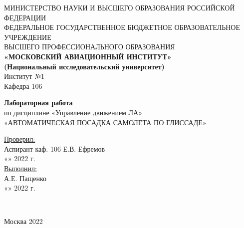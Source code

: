 \begin{center}
    \hfill \break
    \large{МИНИСТЕРСТВО НАУКИ И ВЫСШЕГО ОБРАЗОВАНИЯ РОССИЙСКОЙ ФЕДЕРАЦИИ }\\
    \footnotesize{ФЕДЕРАЛЬНОЕ ГОСУДАРСТВЕННОЕ БЮДЖЕТНОЕ ОБРАЗОВАТЕЛЬНОЕ УЧРЕЖДЕНИЕ}\\ 
    \footnotesize{ВЫСШЕГО ПРОФЕССИОНАЛЬНОГО ОБРАЗОВАНИЯ}\\
    \small{\textbf{«МОСКОВСКИЙ АВИАЦИОННЫЙ ИНСТИТУТ»\\(Национальный исследовательский университет)}}\\ \hline
    \hfill \break
    \normalsize{Институт №1}\\
    \normalsize{Кафедра 106}\\
    \hfill\break

    \large{\textbf{Лабораторная работа} \\ по дисциплине «Управление движением ЛА» }\\

    \normalsize{«АВТОМАТИЧЕСКАЯ ПОСАДКА САМОЛЕТА ПО ГЛИССАДЕ»}\\
\end{center}
\hfill \break

\normalsize{ 
\begin{flushleft}
    \underline{Проверил:} \\
    \hfill \break  
    Аспирант каф. 106 Е.В. Ефремов \\ \hfill \break
    «\underline{\hspace{1cm}}» \underline{\hspace{3cm}} 2022 г. \\ \hfill \break
    \underline{Выполнил:} \\ \hfill \break 
    А.Е. Пащенко \\
    «\underline{\hspace{1cm}}» \underline{\hspace{3cm}} 2022 г. \\ \hfill \break
\end{flushleft}
}\\

\begin{center} Москва 2022 \end{center}
\thispagestyle{empty} %
 \newpage
